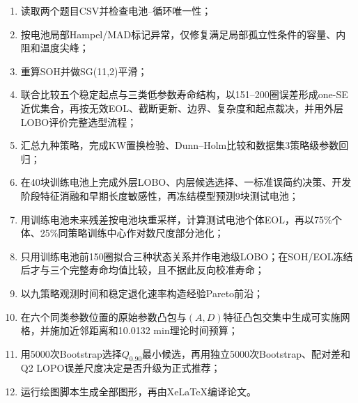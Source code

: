 \documentclass[withoutpreface]{cumcmthesis}
\begin{document}
\begin{enumerate}[label=\arabic*)]
  \item 读取两个题目CSV并检查电池--循环唯一性；
  \item 按电池局部Hampel/MAD标记异常，仅修复满足局部孤立性条件的容量、内阻和温度尖峰；
  \item 重算SOH并做SG(11,2)平滑；
  \item 联合比较五个稳定起点与三类低参数寿命结构，以151--200圈误差形成one-SE近优集合，再按无效EOL、截断更新、边界、复杂度和起点裁决，并用外层LOBO评价完整选型流程；
  \item 汇总九种策略，完成KW置换检验、Dunn--Holm比较和数据集3策略级参数回归；
  \item 在40块训练电池上完成外层LOBO、内层候选选择、一标准误简约决策、开发阶段特征消融和早期长度敏感性，再冻结模型预测9块测试电池；
  \item 用训练电池未来残差按电池块重采样，计算测试电池个体EOL，再以75\%个体、25\%同策略训练中心作对数尺度部分池化；
  \item 只用训练电池前150圈拟合三种状态关系并作电池级LOBO；在SOH/EOL冻结后才与三个完整寿命均值比较，且不据此反向校准寿命；
  \item 以九策略观测时间和稳定退化速率构造经验Pareto前沿；
  \item 在六个同类参数位置的原始参数凸包与$(A,D)$特征凸包交集中生成可实施网格，并施加近邻距离和10.0132 min理论时间预算；
  \item 用5000次Bootstrap选择$Q_{0.90}$最小候选，再用独立5000次Bootstrap、配对差和Q2 LOPO误差尺度决定是否升级为正式推荐；
  \item 运行绘图脚本生成全部图形，再由XeLaTeX编译论文。
\end{enumerate}
\end{document}
